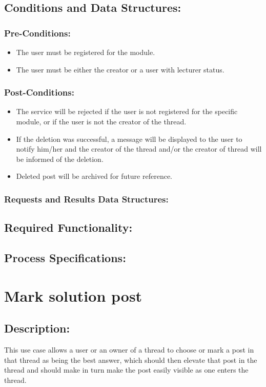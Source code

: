\documentclass[a4paper,11pt]{article}
\begin{document}
\subsection{Conditions and Data Structures:}
\subsubsection*{Pre-Conditions:}
\begin{itemize}
	\item The user must be registered for the module.
	\item The user must be either the creator or a user with lecturer status.
\end{itemize}
\subsubsection*{Post-Conditions:}
\begin{itemize}
	\item The service will be rejected if the user is not registered for the specific module, or if the user is not the creator of the thread.
	\item If the deletion was successful, a message will be displayed to the user to notify him/her and the creator of the thread and/or the creator of thread will be informed of the deletion.
	\item Deleted post will be archived for future reference.
\end{itemize}
\subsubsection*{Requests and Results Data Structures:}
\subsection{Required Functionality:} 
\subsection{Process Specifications:} 

\section{Mark solution post}
\subsection*{Description:}
This use case allows a user or an owner of a thread to choose or mark a post in that thread as being the best answer, which should then elevate that post in the thread and should make in turn make the post easily visible as one enters the thread.
\end{document}
